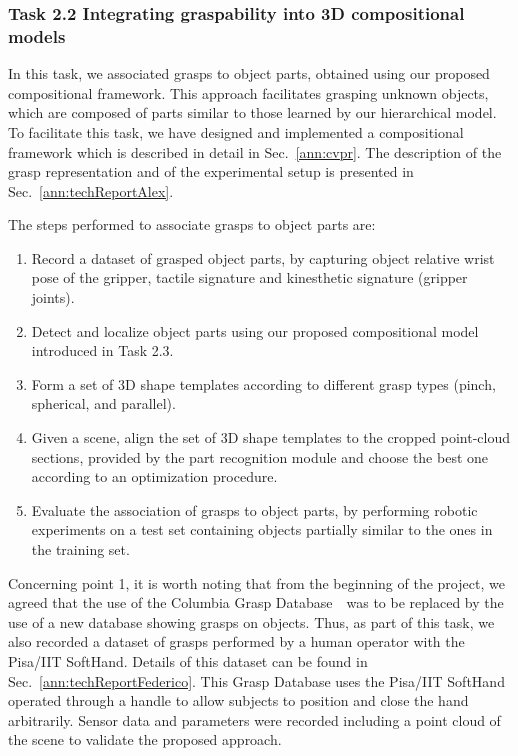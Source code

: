 \documentclass[a4paper,11pt,pdf]{pacmanreport}
\begin{document}
\subsubsection{Task 2.2 Integrating graspability into 3D compositional models}

In this task, we associated grasps to object parts, obtained using our proposed compositional framework. This approach facilitates grasping unknown objects, which are composed of parts similar to those learned by our hierarchical model. To facilitate this task, we have designed and implemented a compositional framework which is described in detail in Sec.~\ref{ann:cvpr}. The description of the grasp representation and of the experimental setup is presented in Sec.~\ref{ann:techReportAlex}.

The steps performed to associate grasps to object parts are:
\begin{enumerate}
\item Record a dataset of grasped object parts, by capturing object relative wrist pose of the gripper, tactile signature and kinesthetic signature (gripper joints).
\item Detect and localize object parts using our proposed compositional model introduced in Task 2.3.
\item Form a set of 3D shape templates according to different grasp types (pinch, spherical, and parallel).
\item Given a scene, align the set of 3D shape templates to the cropped point-cloud sections, provided by the part recognition module and choose the best one according to an optimization procedure.
\item Evaluate the association of grasps to object parts, by performing robotic experiments on a test set containing objects partially similar to the ones in the training set.
\end{enumerate}

Concerning point 1, it is worth noting that from the beginning of the project, we agreed that the use of the Columbia Grasp Database~\ was to be replaced by the use of a new database showing grasps on objects. Thus, as part of this task, we also recorded a dataset of grasps performed by a human operator with the Pisa/IIT SoftHand. Details of this dataset can be found in Sec.~\ref{ann:techReportFederico}. This Grasp Database uses the Pisa/IIT SoftHand operated through a handle to allow subjects to position and close the hand arbitrarily. Sensor data and parameters were recorded including a point cloud of the scene to validate the proposed approach.
\end{document}
